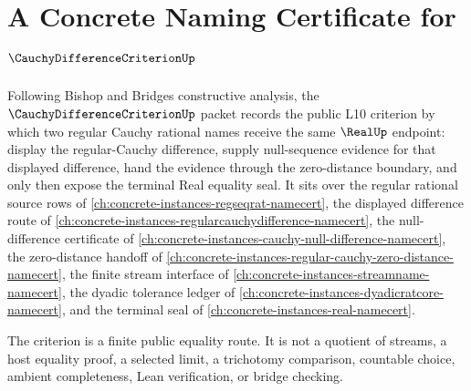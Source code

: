 \chapter{A Concrete Naming Certificate for $\CauchyDifferenceCriterionUp$}
\label{ch:concrete-instances-cauchy-difference-criterion-namecert}

Following Bishop and Bridges constructive analysis, the $\CauchyDifferenceCriterionUp$ packet records the public L10 criterion by which two regular Cauchy rational names receive the same $\RealUp$ endpoint: display the regular-Cauchy difference, supply null-sequence evidence for that displayed difference, hand the evidence through the zero-distance boundary, and only then expose the terminal Real equality seal. It sits over the regular rational source rows of \autoref{ch:concrete-instances-regseqrat-namecert}, the displayed difference route of \autoref{ch:concrete-instances-regularcauchydifference-namecert}, the null-difference certificate of \autoref{ch:concrete-instances-cauchy-null-difference-namecert}, the zero-distance handoff of \autoref{ch:concrete-instances-regular-cauchy-zero-distance-namecert}, the finite stream interface of \autoref{ch:concrete-instances-streamname-namecert}, the dyadic tolerance ledger of \autoref{ch:concrete-instances-dyadicratcore-namecert}, and the terminal seal of \autoref{ch:concrete-instances-real-namecert}.

The criterion is a finite public equality route. It is not a quotient of streams, a host equality proof, a selected limit, a trichotomy comparison, countable choice, ambient completeness, Lean verification, or bridge checking.

